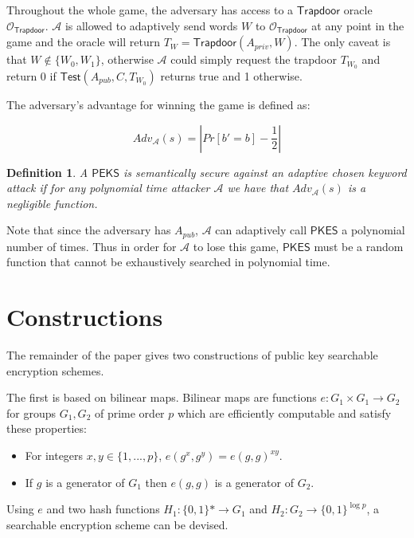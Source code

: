 \documentclass[a4paper,11pt]{article}
\newtheorem{definition}{Definition}
\begin{document}
    Throughout the whole game, the adversary has access to a $\mathsf{Trapdoor}$ oracle $\mathcal{O}_{\mathsf{Trapdoor}}$. $\mathcal{A}$ is allowed to adaptively send words $W$ to $\mathcal{O}_{\mathsf{Trapdoor}}$ at any point in the game and the oracle will return $T_W = \mathsf{Trapdoor}(A_{priv}, W)$. The only caveat is that $W \notin \{W_0, W_1\}$, otherwise $\mathcal{A}$ could simply request the trapdoor $T_{W_0}$ and return 0 if $\mathsf{Test}(A_{pub}, C, T_{W_0})$ returns true and 1 otherwise.

    The adversary's advantage for winning the game is defined as:

    $$Adv_{\mathcal{A}}(s) = |Pr[b' = b] - \frac{1}{2}|$$

    \begin{definition}
        A $\mathsf{PEKS}$ is semantically secure against an adaptive chosen keyword attack if for any polynomial time attacker $\mathcal{A}$ we have that $Adv_{\mathcal{A}}(s)$ is a negligible function.
    \end{definition}

    Note that since the adversary has $A_{pub}$, $\mathcal{A}$ can adaptively call $\mathsf{PKES}$ a polynomial number of times. Thus in order for $\mathcal{A}$ to lose this game, $\mathsf{PKES}$ must be a random function that cannot be exhaustively searched in polynomial time.

    \section{Constructions}

    The remainder of the paper gives two constructions of public key searchable encryption schemes.

    The first is based on bilinear maps. Bilinear maps are functions $e:G_1 \times G_1 \to G_2$ for groups $G_1, G_2$ of prime order $p$ which are efficiently computable and satisfy these properties:

    \begin{itemize}
        \item For integers $x, y \in \{1,...,p\}$, $e(g^x, g^y) = e(g, g)^{xy}$.
        \item If $g$ is a generator of $G_1$ then $e(g, g)$ is a generator of $G_2$.
    \end{itemize}

    Using $e$ and two hash functions $H_1: \{0, 1\}* \to G_1$ and $H_2: G_2 \to \{0, 1\}^{\log p}$, a searchable encryption scheme can be devised.
\end{document}
